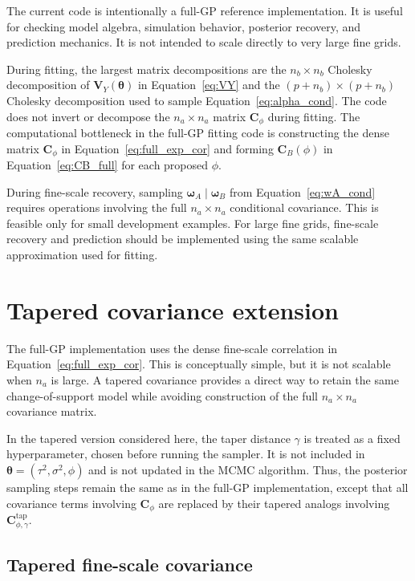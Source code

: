 \documentclass[11pt]{article}
\newcommand{\bsw}{\bm{\omega}}
\newcommand{\bstheta}{\bm{\theta}}
\begin{document}
The current code is intentionally a full-GP reference implementation. It is useful for checking model algebra, simulation behavior, posterior recovery, and prediction mechanics. It is not intended to scale directly to very large fine grids.

During fitting, the largest matrix decompositions are the $n_b\times n_b$ Cholesky decomposition of $\bm{V}_Y(\bstheta)$ in Equation~\eqref{eq:VY} and the $(p+n_b)\times(p+n_b)$ Cholesky decomposition used to sample Equation~\eqref{eq:alpha_cond}. The code does not invert or decompose the $n_a\times n_a$ matrix $\bm{C}_{\phi}$ during fitting. The computational bottleneck in the full-GP fitting code is constructing the dense matrix $\bm{C}_{\phi}$ in Equation~\eqref{eq:full_exp_cor} and forming $\bm{C}_B(\phi)$ in Equation~\eqref{eq:CB_full} for each proposed $\phi$.

During fine-scale recovery, sampling $\bsw_A\mid \bsw_B$ from Equation~\eqref{eq:wA_cond} requires operations involving the full $n_a\times n_a$ conditional covariance. This is feasible only for small development examples. For large fine grids, fine-scale recovery and prediction should be implemented using the same scalable approximation used for fitting.

\section{Tapered covariance extension}

The full-GP implementation uses the dense fine-scale correlation in Equation~\eqref{eq:full_exp_cor}. This is conceptually simple, but it is not scalable when $n_a$ is large. A tapered covariance provides a direct way to retain the same change-of-support model while avoiding construction of the full $n_a\times n_a$ covariance matrix.

In the tapered version considered here, the taper distance $\gamma$ is treated as a fixed hyperparameter, chosen before running the sampler. It is not included in $\bstheta=(\tau^2,\sigma^2,\phi)$ and is not updated in the MCMC algorithm. Thus, the posterior sampling steps remain the same as in the full-GP implementation, except that all covariance terms involving $\bm{C}_{\phi}$ are replaced by their tapered analogs involving $\bm{C}^{\mathrm{tap}}_{\phi,\gamma}$.

\subsection{Tapered fine-scale covariance}
\end{document}
